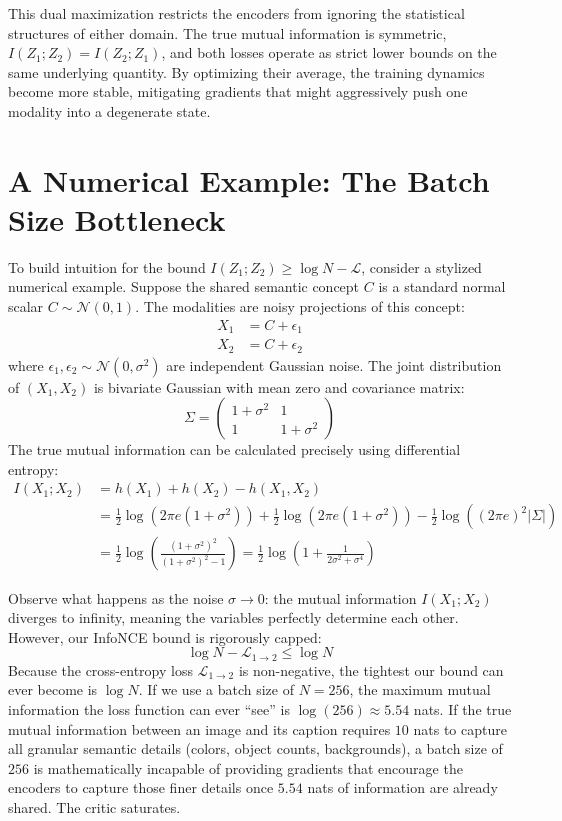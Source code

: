 This dual maximization restricts the encoders from ignoring the statistical structures of either domain. The true mutual information is symmetric, $I(Z_1; Z_2) = I(Z_2; Z_1)$, and both losses operate as strict lower bounds on the same underlying quantity. By optimizing their average, the training dynamics become more stable, mitigating gradients that might aggressively push one modality into a degenerate state.

\section{A Numerical Example: The Batch Size Bottleneck}

To build intuition for the bound $I(Z_1; Z_2) \ge \log N - \mathcal{L}$, consider a stylized numerical example. Suppose the shared semantic concept $C$ is a standard normal scalar $C \sim \mathcal{N}(0, 1)$. The modalities are noisy projections of this concept:
\begin{align*}
    X_1 &= C + \epsilon_1 \\
    X_2 &= C + \epsilon_2
\end{align*}
where $\epsilon_1, \epsilon_2 \sim \mathcal{N}(0, \sigma^2)$ are independent Gaussian noise. 
The joint distribution of $(X_1, X_2)$ is bivariate Gaussian with mean zero and covariance matrix:
\begin{equation}
    \Sigma = \begin{pmatrix} 1 + \sigma^2 & 1 \\ 1 & 1 + \sigma^2 \end{pmatrix}
\end{equation}
The true mutual information can be calculated precisely using differential entropy:
\begin{align*}
    I(X_1; X_2) &= h(X_1) + h(X_2) - h(X_1, X_2) \\
    &= \frac{1}{2} \log (2\pi e (1+\sigma^2)) + \frac{1}{2} \log (2\pi e (1+\sigma^2)) - \frac{1}{2} \log ( (2\pi e)^2 |\Sigma| ) \\
    &= \frac{1}{2} \log \left( \frac{(1+\sigma^2)^2}{(1+\sigma^2)^2 - 1} \right) = \frac{1}{2} \log \left( 1 + \frac{1}{2\sigma^2 + \sigma^4} \right)
\end{align*}

Observe what happens as the noise $\sigma \to 0$: the mutual information $I(X_1; X_2)$ diverges to infinity, meaning the variables perfectly determine each other. However, our InfoNCE bound is rigorously capped:
\begin{equation}
    \log N - \mathcal{L}_{1 \to 2} \le \log N
\end{equation}
Because the cross-entropy loss $\mathcal{L}_{1 \to 2}$ is non-negative, the tightest our bound can ever become is $\log N$. 
If we use a batch size of $N=256$, the maximum mutual information the loss function can ever ``see'' is $\log(256) \approx 5.54$ nats. If the true mutual information between an image and its caption requires $10$ nats to capture all granular semantic details (colors, object counts, backgrounds), a batch size of $256$ is mathematically incapable of providing gradients that encourage the encoders to capture those finer details once $5.54$ nats of information are already shared. The critic saturates.

